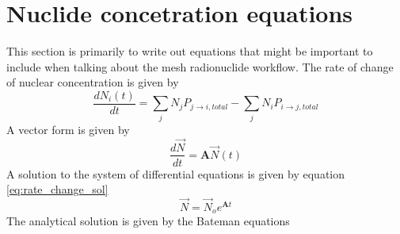 \section{Nuclide concetration equations}
This section is primarily to write out equations that might be
important to include when talking about the mesh radionuclide
workflow. 
The rate of change of nuclear concentration is given by
\begin{equation}\label{eq:nuclide_conc_rc}
    \frac{dN_{i}(t)}{dt} = \sum_{j} N_{j}P_{j \rightarrow i, total}
    - \sum_{j} N_{i}P_{i \rightarrow j, total}
\end{equation}
A vector form is given by
\begin{equation}\label{eq:nuclide_conc_rc_vec}
  \frac{d\vec{N}}{dt} =\boldsymbol{A}  \vec{N}(t)
\end{equation}
A solution to the system of differential equations is given by equation \ref{eq:rate_change_sol}
\begin{equation}\label{rate_change_sol}
  \vec{N} =\vec{N}_{o} e^{\boldsymbol{A}t}
\end{equation}
The analytical solution is given by the Bateman equations

